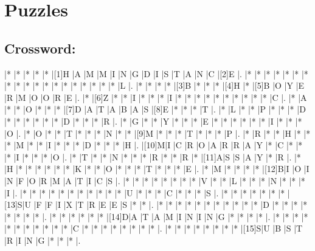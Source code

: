 \documentclass{article}
\begin{document}
\section*{Puzzles}

\subsection*{Crossword:}

\begin{Puzzle}{20}{20} %
|*    |*    |*    |*    |*    |[1]H |A    |M    |M    |I    |N    |G    |D    |I    |S    |T    |A    |N    |C    |[2]E |.
|*    |*    |*    |*    |*    |*    |*    |*    |*    |*    |*    |*    |*    |*    |*    |*    |*    |*    |*    |L    |.
|*    |*    |*    |*    |[3]B |*    |*    |*    |[4]H |*    |[5]B |O    |Y    |E    |R    |M    |O    |O    |R    |E    |.
|*    |[6]Z |*    |*    |I    |*    |*    |*    |I    |*    |*    |*    |*    |*    |*    |*    |*    |*    |*    |C    |.
|*    |A    |*    |*    |O    |*    |*    |*    |[7]D |A    |T    |A    |B    |A    |S    |[8]E |*    |*    |*    |T    |.
|*    |L    |*    |*    |P    |*    |*    |*    |D    |*    |*    |*    |*    |*    |*    |D    |*    |*    |*    |R    |.
|*    |G    |*    |*    |Y    |*    |*    |*    |E    |*    |*    |*    |*    |*    |*    |I    |*    |*    |*    |O    |.
|*    |O    |*    |*    |T    |*    |*    |*    |N    |*    |*    |[9]M |*    |*    |*    |T    |*    |*    |*    |P    |.
|*    |R    |*    |*    |H    |*    |*    |*    |M    |*    |*    |I    |*    |*    |*    |D    |*    |*    |*    |H    |.
|[10]M|I    |C    |R    |O    |A    |R    |R    |A    |Y    |*    |C    |*    |*    |*    |I    |*    |*    |*    |O    |.
|*    |T    |*    |*    |N    |*    |*    |*    |R    |*    |*    |R    |*    |[11]A|S    |S    |A    |Y    |*    |R    |.
|*    |H    |*    |*    |*    |*    |*    |*    |K    |*    |*    |O    |*    |*    |*    |T    |*    |*    |*    |E    |.
|*    |M    |*    |*    |*    |*    |[12]B|I    |O    |I    |N    |F    |O    |R    |M    |A    |T    |I    |C    |S    |.
|*    |*    |*    |*    |*    |*    |*    |*    |V    |*    |*    |L    |*    |*    |*    |N    |*    |*    |*    |I    |.
|*    |*    |*    |*    |*    |*    |*    |*    |*    |*    |*    |U    |*    |*    |*    |C    |*    |*    |*    |S    |.
|*    |*    |*    |*    |*    |*    |*    |[13]S|U    |F    |F    |I    |X    |T    |R    |E    |E    |S    |*    |*    |.
|*    |*    |*    |*    |*    |*    |*    |*    |*    |*    |*    |D    |*    |*    |*    |*    |*    |*    |*    |*    |.
|*    |*    |*    |*    |*    |*    |[14]D|A    |T    |A    |M    |I    |N    |I    |N    |G    |*    |*    |*    |*    |.
|*    |*    |*    |*    |*    |*    |*    |*    |*    |*    |*    |C    |*    |*    |*    |*    |*    |*    |*    |*    |.
|*    |*    |*    |*    |*    |*    |*    |*    |[15]S|U    |B    |S    |T    |R    |I    |N    |G    |*    |*    |*    |.
\end{Puzzle}
\end{document}

